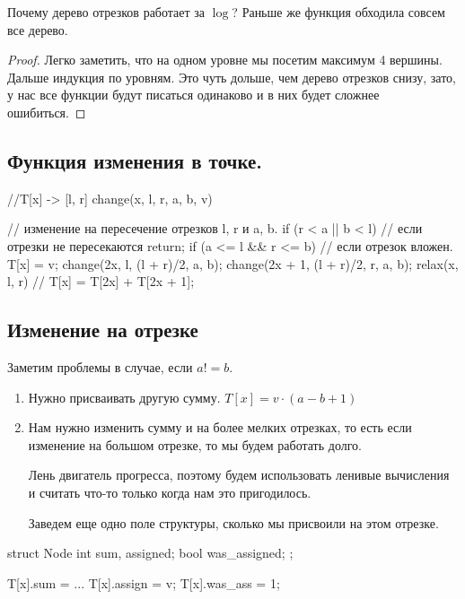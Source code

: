 Почему дерево отрезков работает за $\log$? Раньше же функция обходила совсем все дерево. 

\begin{proof}
Легко заметить, что на одном уровне мы посетим максимум 4 вершины. Дальше индукция по уровням. Это чуть дольше,
чем дерево отрезков снизу, зато, у нас все функции будут писаться одинаково и в них будет сложнее ошибиться.  
\end{proof}

\subsection{Функция изменения в точке.} 

\begin{cppcode}
//T[x] -> [l, r]
change(x, l, r, a, b, v) { // изменение на пересечение отрезков l, r и a, b.
    if (r < a || b < l)  { // если  отрезки не пересекаются
        return;
    }
    if (a <= l && r <= b) { // если отрезок вложен. 
        T[x] = v;
    }
    change(2x, l, (l + r)/2, a, b);
    change(2x + 1, (l + r)/2, r, a, b);
    relax(x, l, r) // T[x] = T[2x] + T[2x + 1];

}
\end{cppcode}

\subsection{Изменение на отрезке}

Заметим проблемы в случае, если $a != b$. 
\begin{enumerate}
    \item Нужно присваивать другую сумму. 
    $T[x] = v \cdot (a - b + 1)$
    \item Нам нужно изменить сумму и на более мелких отрезках, 
    то есть если изменение на большом отрезке, то мы будем работать долго. 

    Лень двигатель прогресса, поэтому будем использовать ленивые вычисления и считать что-то только когда нам это пригодилось. 

    Заведем еще одно поле структуры, сколько мы присвоили на этом отрезке. 
\end{enumerate}


\begin{cppcode}
struct Node{ 
    int sum, assigned;
    bool was_assigned;
};

T[x].sum = ...
T[x].assign = v;
T[x].was_ass = 1;
\end{cppcode}

